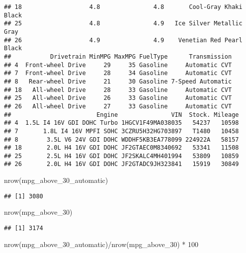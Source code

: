 \documentclass[
]{article}
\newenvironment{Shaded}{\begin{snugshade}}{\end{snugshade}}
\newcommand{\DecValTok}[1]{\textcolor[rgb]{0.00,0.00,0.81}{#1}}
\newcommand{\FunctionTok}[1]{\textcolor[rgb]{0.00,0.00,0.00}{#1}}
\newcommand{\NormalTok}[1]{#1}
\newcommand{\SpecialCharTok}[1]{\textcolor[rgb]{0.00,0.00,0.00}{#1}}
\begin{document}
\begin{verbatim}
## 18                   4.8               4.8       Cool-Gray Khaki         Black
## 25                   4.8               4.9   Ice Silver Metallic          Gray
## 26                   4.9               4.9    Venetian Red Pearl         Black
##           Drivetrain MinMPG MaxMPG FuelType      Transmission
## 4  Front-wheel Drive     29     35 Gasoline     Automatic CVT
## 7  Front-wheel Drive     28     34 Gasoline     Automatic CVT
## 8   Rear-wheel Drive     21     30 Gasoline 7-Speed Automatic
## 18   All-wheel Drive     28     33 Gasoline     Automatic CVT
## 25   All-wheel Drive     26     33 Gasoline     Automatic CVT
## 26   All-wheel Drive     27     33 Gasoline     Automatic CVT
##                        Engine               VIN  Stock. Mileage
## 4  1.5L I4 16V GDI DOHC Turbo 1HGCV1F49MA038035   54237   10598
## 7       1.8L I4 16V MPFI SOHC 3CZRU5H32HG703897   T1480   10458
## 8        3.5L V6 24V GDI DOHC WDDHF5KB3EA778099 224922A   58157
## 18       2.0L H4 16V GDI DOHC JF2GTAEC0M8340692   53341   11508
## 25       2.5L H4 16V GDI DOHC JF2SKALC4MH401994   53809   10859
## 26       2.0L H4 16V GDI DOHC JF2GTADC9JH323841   15919   30849
\end{verbatim}

\begin{Shaded}
\begin{Highlighting}[]
\FunctionTok{nrow}\NormalTok{(mpg\_above\_30\_automatic)}
\end{Highlighting}
\end{Shaded}

\begin{verbatim}
## [1] 3080
\end{verbatim}

\begin{Shaded}
\begin{Highlighting}[]
\FunctionTok{nrow}\NormalTok{(mpg\_above\_30)}
\end{Highlighting}
\end{Shaded}

\begin{verbatim}
## [1] 3174
\end{verbatim}

\begin{Shaded}
\begin{Highlighting}[]
\FunctionTok{nrow}\NormalTok{(mpg\_above\_30\_automatic)}\SpecialCharTok{/}\FunctionTok{nrow}\NormalTok{(mpg\_above\_30) }\SpecialCharTok{*} \DecValTok{100}
\end{Highlighting}
\end{Shaded}
\end{document}
